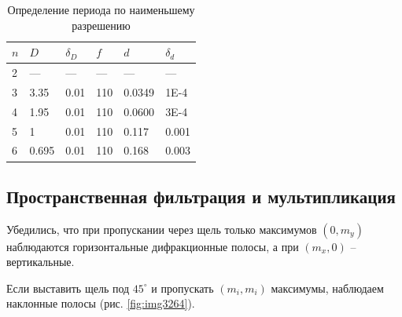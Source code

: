 \documentclass[a4paper]{article}
\begin{document}
\begin{table}[h]
	\centering
	\begin{tabular}{|l|l|l|l|l|l|}
		\hline
		$n$ & $D$   & $\delta_D$ & $f$ & $d$    & $\delta_d$ \\ \hline
		2   & ---   & ---        & --- & ---    & ---        \\ \hline
		3   & 3.35  & 0.01       & 110 & 0.0349 & 1E-4       \\ \hline
		4   & 1.95  & 0.01       & 110 & 0.0600 & 3E-4       \\ \hline
		5   & 1     & 0.01       & 110 & 0.117  & 0.001      \\ \hline
		6   & 0.695 & 0.01       & 110 & 0.168  & 0.003      \\ \hline
	\end{tabular}
	\caption{Определение периода по наименьшему разрешению}
	\label{tab:разрешение}
\end{table} 

\subsection{Пространственная фильтрация и мультипликация}

Убедились, что при пропускании через щель только максимумов $ (0, m_y) $ наблюдаются горизонтальные дифракционные полосы, а при $ (m_x, 0) $ -- вертикальные.

Если выставить щель под $ 45^\circ $ и пропускать $ (m_i, m_i) $ максимумы, наблюдаем наклонные полосы (рис. \ref{fig:img3264}).
\end{document}
